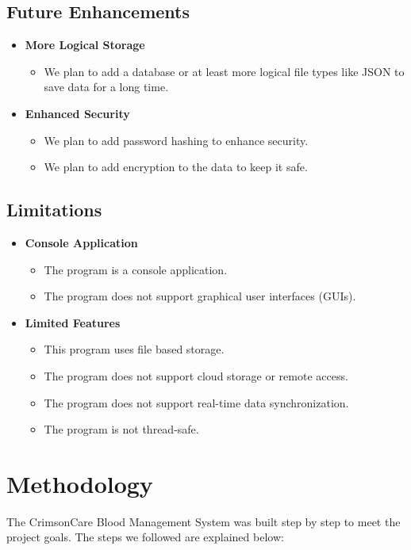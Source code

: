 \documentclass[12pt,a4paper]{report}
\begin{document}
\subsection{Future Enhancements}
\begin{itemize}
    \item \normalsize \textbf{More Logical Storage}
    \begin{itemize}
        \item We plan to add a database or at least more logical file types like JSON to save data for a long time.
    \end{itemize}
    \item \normalsize \textbf{Enhanced Security}
    \begin{itemize}
        \item We plan to add password hashing to enhance security.
        \item We plan to add encryption to the data to keep it safe.
    \end{itemize}
\end{itemize}

\subsection{Limitations}
\begin{itemize}
    \item \normalsize \textbf{Console Application}
    \begin{itemize}
        \item The program is a console application.
        \item The program does not support graphical user interfaces (GUIs).
    \end{itemize}
    \item \normalsize \textbf{Limited Features}
    \begin{itemize}
        \item This program uses file based storage.
        \item The program does not support cloud storage or remote access.
        \item The program does not support real-time data synchronization.
        \item The program is not thread-safe.
    \end{itemize}
\end{itemize}

\section{Methodology}
The CrimsonCare Blood Management System was built step by step to meet the project goals. The steps we followed are explained below:
\end{document}
